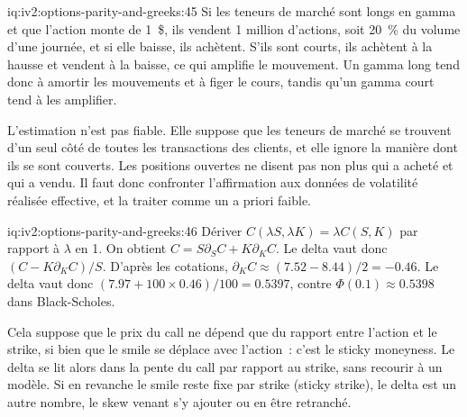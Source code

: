 \begin{solution}{iq:iv2:options-parity-and-greeks:45}
Si les teneurs de marché sont longs en gamma et que l'action monte de 1~\$, ils vendent 1 million d'actions, soit 20~\% du volume d'une journée, et si elle baisse, ils achètent. S'ils sont courts, ils achètent à la hausse et vendent à la baisse, ce qui amplifie le mouvement. Un gamma long tend donc à amortir les mouvements et à figer le cours, tandis qu'un gamma court tend à les amplifier.

L'estimation n'est pas fiable. Elle suppose que les teneurs de marché se trouvent d'un seul côté de toutes les transactions des clients, et elle ignore la manière dont ils se sont couverts. Les positions ouvertes ne disent pas non plus qui a acheté et qui a vendu. Il faut donc confronter l'affirmation aux données de volatilité réalisée effective, et la traiter comme un a priori faible.

\end{solution}

\begin{solution}{iq:iv2:options-parity-and-greeks:46}
Dériver $C(\lambda S, \lambda K) = \lambda C(S, K)$ par rapport à $\lambda$ en 1. On obtient $C = S\partial_S C + K\partial_K C$. Le delta vaut donc $(C - K\partial_K C)/S$. D'après les cotations, $\partial_K C \approx (7.52 - 8.44)/2 = -0.46$. Le delta vaut donc $(7.97 + 100 \times 0.46)/100 = 0.5397$, contre $\Phi(0.1) \approx 0.5398$ dans Black-Scholes.

Cela suppose que le prix du call ne dépend que du rapport entre l'action et le strike, si bien que le smile se déplace avec l'action~: c'est le sticky moneyness. Le delta se lit alors dans la pente du call par rapport au strike, sans recourir à un modèle. Si en revanche le smile reste fixe par strike (sticky strike), le delta est un autre nombre, le skew venant s'y ajouter ou en être retranché.

\end{solution}

